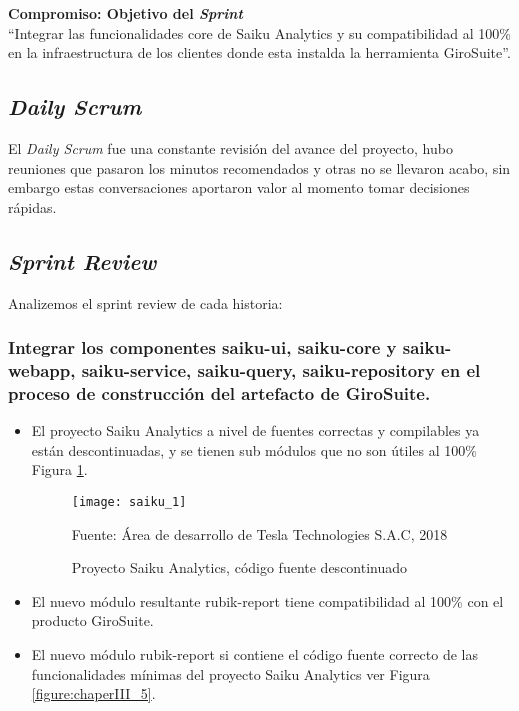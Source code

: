 \begin{spacing}{1.5}
		\textbf{Compromiso: Objetivo del \textit{Sprint}}\\
	``Integrar las funcionalidades core de Saiku Analytics y su compatibilidad al 100\% en la infraestructura de los clientes donde esta instalda la herramienta GiroSuite''.\\
		
	\subsection{\textit{Daily Scrum}}
		El \textit{Daily Scrum} fue una constante revisi\'{o}n del avance del proyecto, hubo reuniones que pasaron los minutos recomendados y otras no se llevaron acabo, sin embargo estas conversaciones aportaron valor al momento tomar decisiones r\'{a}pidas.
	
	\clearpage		
	\subsection{\textit{Sprint Review}}
		Analizemos el sprint review de cada historia:
		\subsubsection{Integrar los componentes saiku-ui, saiku-core y saiku-webapp, saiku-service, saiku-query, saiku-repository en el proceso de construcción del artefacto de GiroSuite.}
		
		\begin{itemize}
			\item El proyecto Saiku Analytics a nivel de fuentes correctas y compilables ya est\'{a}n descontinuadas, y se tienen sub m\'{o}dulos que no son \'{u}tiles al 100\% Figura \ref{figure:chaperIII_4}.
			
			\begin{figure}[H]
				\centering
				\texttt{[image: saiku\_1]}
				\caption {\centering \small{Proyecto Saiku Analytics, c\'{o}digo fuente descontinuado}} \label{figure:chaperIII_4}
				\small {Fuente: \'{A}rea de desarrollo de Tesla Technologies S.A.C, 2018}
			\end{figure}
			\item El nuevo m\'{o}dulo resultante rubik-report tiene compatibilidad al 100\% con el producto GiroSuite.
			\item El nuevo m\'{o}dulo rubik-report si contiene el c\'{o}digo fuente correcto de las funcionalidades m\'{i}nimas del proyecto Saiku Analytics ver Figura \ref{figure:chaperIII_5}.
			

\end{itemize}
\end{spacing}
